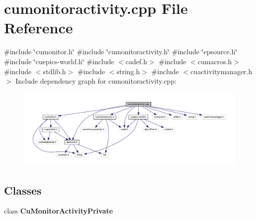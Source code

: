 \section{cumonitoractivity.\+cpp File Reference}
\label{cumonitoractivity_8cpp}
{\ttfamily \#include \char`\"{}cumonitor.\+h\char`\"{}}\newline
{\ttfamily \#include \char`\"{}cumonitoractivity.\+h\char`\"{}}\newline
{\ttfamily \#include \char`\"{}epsource.\+h\char`\"{}}\newline
{\ttfamily \#include \char`\"{}cuepics-\/world.\+h\char`\"{}}\newline
{\ttfamily \#include $<$cadef.\+h$>$}\newline
{\ttfamily \#include $<$cumacros.\+h$>$}\newline
{\ttfamily \#include $<$stdlib.\+h$>$}\newline
{\ttfamily \#include $<$string.\+h$>$}\newline
{\ttfamily \#include $<$cuactivitymanager.\+h$>$}\newline
Include dependency graph for cumonitoractivity.\+cpp\+:\nopagebreak
\begin{figure}[H]
\begin{center}
\leavevmode
\includegraphics[width=350pt]{cumonitoractivity_8cpp__incl}
\end{center}
\end{figure}
\subsection*{Classes}
\begin{DoxyCompactItemize}
\item 
class \textbf{ Cu\+Monitor\+Activity\+Private}
\end{DoxyCompactItemize}
